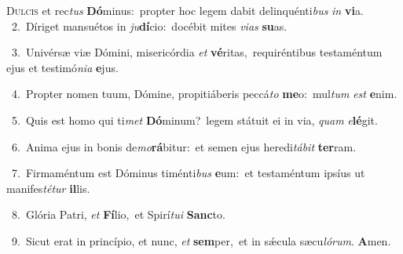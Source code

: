 \lettrine{\initial\textcolor{\initialcolor}{D}}{ulcis} et rec\textit{tus} \textbf{Dó}\-minus:~\star propter hoc legem dabit delinquénti\textit{bus} \textit{in} \textbf{vi}\-a.\\
{\numbfont\textcolor{\numbcolor}{~2.}}~Díriget mansuétos in \textit{ju}\-\textbf{dí}cio:~\star docébit mites \textit{vi}\-\textit{as} \textbf{su}\-as.\par
{\numbfont\textcolor{\numbcolor}{~3.}}~Univérsæ viæ Dómini, misericórdia \textit{et} \textbf{vé}\-ritas,~\star requiréntibus testaméntum ejus et testimó\-\textit{ni}\-\textit{a} \textbf{e}\-jus.\par
{\numbfont\textcolor{\numbcolor}{~4.}}~Propter nomen tuum, Dómine, propitiáberis peccá\textit{to} \textbf{me}\-o:~\star mul\textit{tum} \textit{est} \textbf{e}\-nim.\par
{\numbfont\textcolor{\numbcolor}{~5.}}~Quis est homo qui ti\textit{met} \textbf{Dó}\-minum?~\star legem státuit ei in via, \textit{quam} \textit{e}\-\textbf{lé}git.\par
{\numbfont\textcolor{\numbcolor}{~6.}}~Anima ejus in bonis de\-\textit{mo}\-\textbf{rá}bitur:~\star et semen ejus heredi\-\textit{tá}\-\textit{bit} \textbf{ter}\-ram.\par
{\numbfont\textcolor{\numbcolor}{~7.}}~Firmaméntum est Dóminus timénti\textit{bus} \textbf{e}\-um:~\star et testaméntum ipsíus ut manifes\-\textit{té}\-\textit{tur} \textbf{il}\-lis.\par
{\numbfont\textcolor{\numbcolor}{~8.}}~Glória Patri, \textit{et} \textbf{Fí}\-lio,~\star et Spirí\-\textit{tu}\-\textit{i} \textbf{Sanc}\-to.\par
{\numbfont\textcolor{\numbcolor}{~9.}}~Sicut erat in princípio, et nunc, \textit{et} \textbf{sem}\-per,~\star et in sǽcula sæcu\-\textit{ló}\-\textit{rum}. \textbf{A}\-men.\par
